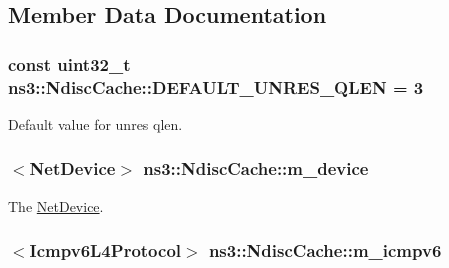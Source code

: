 \subsection{Member Data Documentation}
\subsubsection[{\texorpdfstring{D\+E\+F\+A\+U\+L\+T\+\_\+\+U\+N\+R\+E\+S\+\_\+\+Q\+L\+EN}{DEFAULT_UNRES_QLEN}}]{\setlength{\rightskip}{0pt plus 5cm}const uint32\+\_\+t ns3\+::\+Ndisc\+Cache\+::\+D\+E\+F\+A\+U\+L\+T\+\_\+\+U\+N\+R\+E\+S\+\_\+\+Q\+L\+EN = 3\hspace{0.3cm}{\ttfamily [static]}}\hypertarget{classns3_1_1NdiscCache_a94090313987a52a1bab8375aac8af3bc}{}\label{classns3_1_1NdiscCache_a94090313987a52a1bab8375aac8af3bc}


Default value for unres qlen. 

\subsubsection[{\texorpdfstring{m\+\_\+device}{m_device}}]{$<${\bf Net\+Device}$>$ ns3\+::\+Ndisc\+Cache\+::m\+\_\+device\hspace{0.3cm}{\ttfamily [private]}}\hypertarget{classns3_1_1NdiscCache_a7c47880e5c9b373c3082b710bef76474}{}\label{classns3_1_1NdiscCache_a7c47880e5c9b373c3082b710bef76474}


The \hyperlink{classns3_1_1NetDevice}{Net\+Device}. 

\subsubsection[{\texorpdfstring{m\+\_\+icmpv6}{m_icmpv6}}]{$<${\bf Icmpv6\+L4\+Protocol}$>$ ns3\+::\+Ndisc\+Cache\+::m\+\_\+icmpv6\hspace{0.3cm}{\ttfamily [private]}}\hypertarget{classns3_1_1NdiscCache_adddcf05355092f4623c6defce1f0505a}{}\label{classns3_1_1NdiscCache_adddcf05355092f4623c6defce1f0505a}


